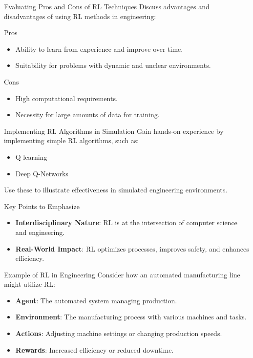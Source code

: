 \documentclass[aspectratio=169]{beamer}
\begin{document}
\begin{frame}[fragile]{Evaluating Pros and Cons of RL Techniques}
    Discuss advantages and disadvantages of using RL methods in engineering:
    \begin{block}{Pros}
        \begin{itemize}
            \item Ability to learn from experience and improve over time.
            \item Suitability for problems with dynamic and unclear environments.
        \end{itemize}
    \end{block}
    
    \begin{block}{Cons}
        \begin{itemize}
            \item High computational requirements.
            \item Necessity for large amounts of data for training.
        \end{itemize}
    \end{block}
\end{frame}

\begin{frame}[fragile]{Implementing RL Algorithms in Simulation}
    Gain hands-on experience by implementing simple RL algorithms, such as:
    \begin{itemize}
        \item Q-learning
        \item Deep Q-Networks
    \end{itemize}
    Use these to illustrate effectiveness in simulated engineering environments.
\end{frame}

\begin{frame}[fragile]{Key Points to Emphasize}
    \begin{itemize}
        \item \textbf{Interdisciplinary Nature}: RL is at the intersection of computer science and engineering.
        \item \textbf{Real-World Impact}: RL optimizes processes, improves safety, and enhances efficiency.
    \end{itemize}
\end{frame}

\begin{frame}[fragile]{Example of RL in Engineering}
    Consider how an automated manufacturing line might utilize RL:
    \begin{itemize}
        \item \textbf{Agent}: The automated system managing production.
        \item \textbf{Environment}: The manufacturing process with various machines and tasks.
        \item \textbf{Actions}: Adjusting machine settings or changing production speeds.
        \item \textbf{Rewards}: Increased efficiency or reduced downtime.
    \end{itemize}
\end{frame}
\end{document}
